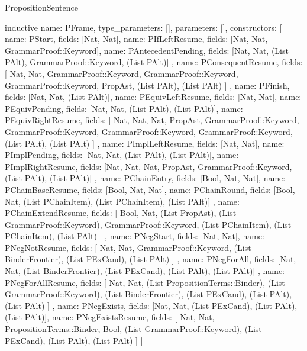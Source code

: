 \begin{lexlean}{PropositionSentence}
\begin{semanticmodule}
inductive{
  name: PFrame,
  type_parameters: [],
  parameters: [],
  constructors: [
    {name: PStart, fields: [Nat, Nat]},
    {name: PIfLeftResume, fields: [Nat, Nat, GrammarProof::Keyword]},
    {
      name: PAntecedentPending,
      fields: [Nat, Nat, (List PAlt), GrammarProof::Keyword, (List PAlt)]
    },
    {
      name: PConsequentResume,
      fields: [
        Nat,
        Nat,
        GrammarProof::Keyword,
        GrammarProof::Keyword,
        GrammarProof::Keyword,
        PropAst,
        (List PAlt),
        (List PAlt)
      ]
    },
    {name: PFinish, fields: [Nat, Nat, (List PAlt)]},
    {name: PEquivLeftResume, fields: [Nat, Nat]},
    {name: PEquivPending, fields: [Nat, Nat, (List PAlt), (List PAlt)]},
    {
      name: PEquivRightResume,
      fields: [
        Nat,
        Nat,
        Nat,
        PropAst,
        GrammarProof::Keyword,
        GrammarProof::Keyword,
        GrammarProof::Keyword,
        GrammarProof::Keyword,
        (List PAlt),
        (List PAlt)
      ]
    },
    {name: PImplLeftResume, fields: [Nat, Nat]},
    {name: PImplPending, fields: [Nat, Nat, (List PAlt), (List PAlt)]},
    {
      name: PImplRightResume,
      fields: [Nat, Nat, Nat, PropAst, GrammarProof::Keyword, (List PAlt), (List PAlt)]
    },
    {name: PChainEntry, fields: [Bool, Nat, Nat]},
    {name: PChainBaseResume, fields: [Bool, Nat, Nat]},
    {
      name: PChainRound,
      fields: [Bool, Nat, (List PChainItem), (List PChainItem), (List PAlt)]
    },
    {
      name: PChainExtendResume,
      fields: [
        Bool,
        Nat,
        (List PropAst),
        (List GrammarProof::Keyword),
        GrammarProof::Keyword,
        (List PChainItem),
        (List PChainItem),
        (List PAlt)
      ]
    },
    {name: PNegStart, fields: [Nat, Nat]},
    {
      name: PNegNotResume,
      fields: [
        Nat,
        Nat,
        GrammarProof::Keyword,
        (List BinderFrontier),
        (List PExCand),
        (List PAlt)
      ]
    },
    {
      name: PNegForAll,
      fields: [Nat, Nat, (List BinderFrontier), (List PExCand), (List PAlt), (List PAlt)]
    },
    {
      name: PNegForAllResume,
      fields: [
        Nat,
        Nat,
        (List PropositionTerms::Binder),
        (List GrammarProof::Keyword),
        (List BinderFrontier),
        (List PExCand),
        (List PAlt),
        (List PAlt)
      ]
    },
    {name: PNegExists, fields: [Nat, Nat, (List PExCand), (List PAlt), (List PAlt)]},
    {
      name: PNegExistsResume,
      fields: [
        Nat,
        Nat,
        PropositionTerms::Binder,
        Bool,
        (List GrammarProof::Keyword),
        (List PExCand),
        (List PAlt),
        (List PAlt)
      ]
    }
  ]
}


\end{semanticmodule}
\end{lexlean}
